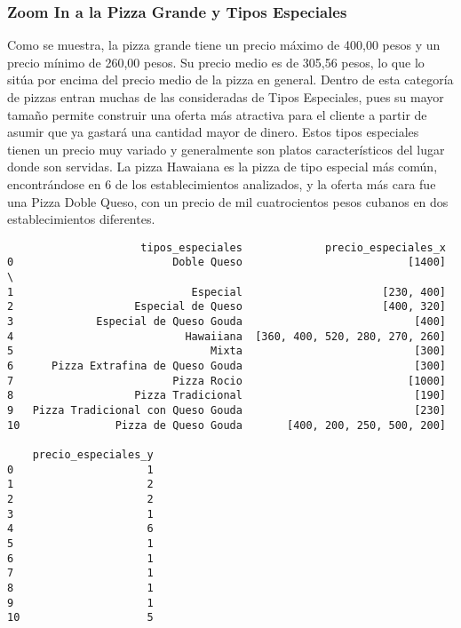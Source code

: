 \hypertarget{zoom-in-a-la-pizza-grande-y-tipos-especiales}{%
\subsubsection{Zoom In a la Pizza Grande y Tipos
Especiales}\label{zoom-in-a-la-pizza-grande-y-tipos-especiales}}

Como se muestra, la pizza grande tiene un precio máximo de 400,00 pesos
y un precio mínimo de 260,00 pesos. Su precio medio es de 305,56 pesos,
lo que lo sitúa por encima del precio medio de la pizza en general.
Dentro de esta categoría de pizzas entran muchas de las consideradas de
Tipos Especiales, pues su mayor tamaño permite construir una oferta más
atractiva para el cliente a partir de asumir que ya gastará una cantidad
mayor de dinero. Estos tipos especiales tienen un precio muy variado y
generalmente son platos característicos del lugar donde son servidas. La
pizza Hawaiana es la pizza de tipo especial más común, encontrándose en
6 de los establecimientos analizados, y la oferta más cara fue una Pizza
Doble Queso, con un precio de mil cuatrocientos pesos cubanos en dos
establecimientos diferentes.


\begin{verbatim}
                     tipos_especiales             precio_especiales_x   
0                         Doble Queso                          [1400]  \
1                            Especial                      [230, 400]   
2                   Especial de Queso                      [400, 320]   
3             Especial de Queso Gouda                           [400]   
4                           Hawaiiana  [360, 400, 520, 280, 270, 260]   
5                               Mixta                           [300]   
6      Pizza Extrafina de Queso Gouda                           [300]   
7                         Pizza Rocio                          [1000]   
8                   Pizza Tradicional                           [190]   
9   Pizza Tradicional con Queso Gouda                           [230]   
10               Pizza de Queso Gouda       [400, 200, 250, 500, 200]   

    precio_especiales_y  
0                     1  
1                     2  
2                     2  
3                     1  
4                     6  
5                     1  
6                     1  
7                     1  
8                     1  
9                     1  
10                    5  
\end{verbatim}


